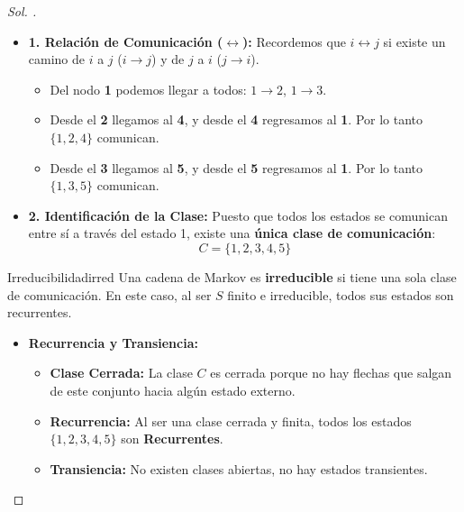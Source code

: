 \documentclass[10pt,a4paper]{article}
\begin{document}
\begin{proof}[\textit{ Sol. }]
    
    \begin{itemize}
        \item \textbf{1. Relación de Comunicación ($\leftrightarrow$):} 
        Recordemos que $i \leftrightarrow j$ si existe un camino de $i$ a $j$ ($i \to j$) y de $j$ a $i$ ($j \to i$).
        
        \begin{itemize}
            \item Del nodo \textbf{1} podemos llegar a todos: $1 \to 2$, $1 \to 3$.
            \item Desde el \textbf{2} llegamos al \textbf{4}, y desde el \textbf{4} regresamos al \textbf{1}. Por lo tanto $\{1, 2, 4\}$ comunican.
            \item Desde el \textbf{3} llegamos al \textbf{5}, y desde el \textbf{5} regresamos al \textbf{1}. Por lo tanto $\{1, 3, 5\}$ comunican.
        \end{itemize}

        \item \textbf{2. Identificación de la Clase:}
        Puesto que todos los estados se comunican entre sí a través del estado 1, existe una \textbf{única clase de comunicación}:
        \[ C = \{1, 2, 3, 4, 5\} \]
    \end{itemize}

    \begin{mytheo}{Irreducibilidad}{irred}
        Una cadena de Markov es \textbf{irreducible} si tiene una sola clase de comunicación. En este caso, al ser $S$ finito e irreducible, todos sus estados son recurrentes.
    \end{mytheo}

    \begin{itemize}
        \item \textbf{Recurrencia y Transiencia:}
        \begin{itemize}
            \item \textbf{Clase Cerrada:} La clase $C$ es cerrada porque no hay flechas que salgan de este conjunto hacia algún estado externo.
            \item \textbf{Recurrencia:} Al ser una clase cerrada y finita, todos los estados $\{1, 2, 3, 4, 5\}$ son \textbf{Recurrentes}.
            \item \textbf{Transiencia:} No existen clases abiertas, no hay estados transientes.
        \end{itemize}
    \end{itemize}
\end{proof}
\end{document}
